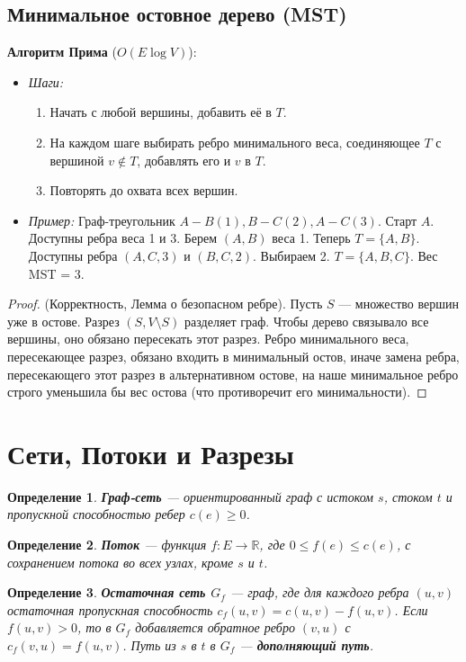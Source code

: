 \documentclass[12pt, a4paper]{article}
\newtheorem{definition}{Определение}
\begin{document}
\subsection{Минимальное остовное дерево (MST)}
\textbf{Алгоритм Прима} ($O(E \log V)$):
\begin{itemize}
    \item \textit{Шаги:}
    \begin{enumerate}
        \item Начать с любой вершины, добавить её в $T$.
        \item На каждом шаге выбирать ребро минимального веса, соединяющее $T$ с вершиной $v \notin T$, добавлять его и $v$ в $T$.
        \item Повторять до охвата всех вершин.
    \end{enumerate}
    \item \textit{Пример:} Граф-треугольник $A-B(1), B-C(2), A-C(3)$. Старт $A$. Доступны ребра веса 1 и 3. Берем $(A, B)$ веса 1. Теперь $T=\{A, B\}$. Доступны ребра $(A, C, 3)$ и $(B, C, 2)$. Выбираем 2. $T=\{A, B, C\}$. Вес MST = 3.
\end{itemize}
\begin{proof}
(Корректность, Лемма о безопасном ребре). Пусть $S$ --- множество вершин уже в остове. Разрез $(S, V \setminus S)$ разделяет граф. Чтобы дерево связывало все вершины, оно обязано пересекать этот разрез. Ребро минимального веса, пересекающее разрез, обязано входить в минимальный остов, иначе замена ребра, пересекающего этот разрез в альтернативном остове, на наше минимальное ребро строго уменьшила бы вес остова (что противоречит его минимальности).
\end{proof}

\section{Сети, Потоки и Разрезы}

\begin{definition}
\textbf{Граф-сеть} --- ориентированный граф с истоком $s$, стоком $t$ и пропускной способностью ребер $c(e) \ge 0$.
\end{definition}

\begin{definition}
\textbf{Поток} --- функция $f: E \to \mathbb{R}$, где $0 \le f(e) \le c(e)$, с сохранением потока во всех узлах, кроме $s$ и $t$.
\end{definition}

\begin{definition}
\textbf{Остаточная сеть $G_f$} --- граф, где для каждого ребра $(u,v)$ остаточная пропускная способность $c_f(u, v) = c(u, v) - f(u, v)$. Если $f(u, v) > 0$, то в $G_f$ добавляется обратное ребро $(v, u)$ с $c_f(v, u) = f(u, v)$. Путь из $s$ в $t$ в $G_f$ --- \textbf{дополняющий путь}.
\end{definition}
\end{document}
